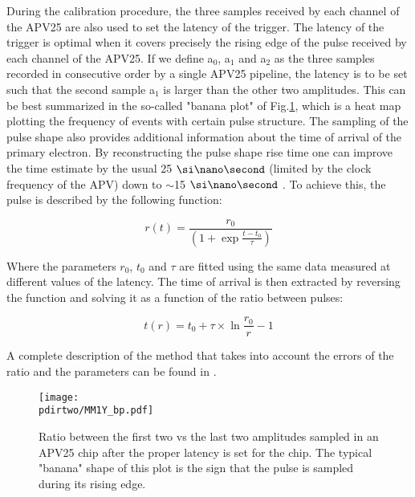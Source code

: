 During the calibration procedure, the three samples received by each channel of the APV25 are also used to set the latency of the trigger. The latency of the trigger is optimal when it covers precisely the rising edge of the pulse received by each channel of the APV25. If we define a$_0$, a$_1$ and a$_2$ as the three samples recorded in consecutive order by a single APV25 pipeline, the latency is to be set such that the second sample a$_1$ is larger than the other two amplitudes. This can be best summarized in the so-called "banana plot" of Fig.\ref{fig:banana-plot}, which is a heat map plotting the frequency of events with certain pulse structure. The sampling of the pulse shape also provides additional information about the time of arrival of the primary electron. By reconstructing the pulse shape rise time one can improve the time estimate by the usual 25 $\nas$ (limited by the clock frequency of the APV) down to $\sim$15 $\nas$ \cite{Banerjee:2017mdu}. To achieve this, the pulse is described by the following function:

\begin{equation}
\label{eq:apv-pulse}
r(t) = \frac{r_0}{(1 + \exp{\frac{t-t_0}{\tau}})}
\end{equation}

Where the parameters $r_0$, $t_0$ and $\tau$ are fitted using the same data measured at different values of the latency. The time of arrival is then extracted by reversing the function and solving it as a function of the ratio between pulses:

\begin{equation}
\label{eq:2}
t(r) = t_0 + \tau \times \ln{\frac{r_0}{r} - 1}
\end{equation}

A complete description of the method that takes into account the errors of the ratio and the parameters can be found in \cite{dbanerjee-thesis}.

\begin{figure}[!bth]
  \centering
  \texttt{[image: \\pdirtwo/MM1Y\_bp.pdf]}
\caption[APV25 banana plot]{Ratio between the first two vs the last two amplitudes sampled in an APV25 chip after the proper latency is set for the chip. The typical "banana" shape of this plot is the sign that the pulse is sampled during its rising edge.}
\label{fig:banana-plot}
\end{figure}

